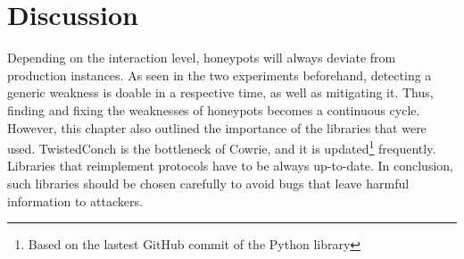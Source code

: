 \section{Discussion}

Depending on the interaction level, honeypots will always deviate from production instances.
As seen in the two experiments beforehand, detecting a generic weakness is doable in a respective time, as well as mitigating it.
Thus, finding and fixing the weaknesses of honeypots becomes a continuous cycle.
However, this chapter also outlined the importance of the libraries that were used.
TwistedConch is the bottleneck of Cowrie, and it is updated\footnote{Based on the lastest GitHub commit of the Python library} frequently.
Libraries that reimplement protocols have to be always up-to-date.
In conclusion, such libraries should be chosen carefully to avoid bugs that leave harmful information to attackers.


